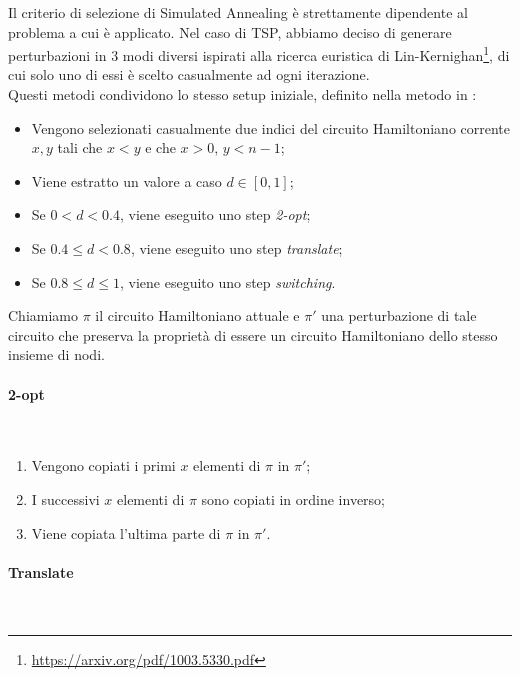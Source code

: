 Il criterio di selezione di Simulated Annealing è strettamente dipendente al problema a cui è applicato. Nel caso di TSP, abbiamo deciso di generare perturbazioni in 3 modi diversi ispirati alla ricerca euristica di Lin-Kernighan\footnote{\url{https://arxiv.org/pdf/1003.5330.pdf}}, di cui solo uno di essi è scelto casualmente ad ogni iterazione. \\

\noindent Questi metodi condividono lo stesso setup iniziale, definito nella metodo  in :

\begin{itemize}
    \item Vengono selezionati casualmente due indici del circuito Hamiltoniano corrente $x, y$ tali che $x < y$ e che $x > 0$, $y < n - 1$;
    \item Viene estratto un valore a caso $d \in [0, 1]$;
    \item Se $0 < d < 0.4$, viene eseguito uno step \textit{2-opt};
    \item Se $0.4 \leq d < 0.8$, viene eseguito uno step \textit{translate};
    \item Se $0.8 \leq d \leq 1$, viene eseguito uno step \textit{switching}.
\end{itemize}

\noindent Chiamiamo $\pi$ il circuito Hamiltoniano attuale e $\pi'$ una perturbazione di tale circuito che preserva la proprietà di essere un circuito Hamiltoniano dello stesso insieme di nodi.

\paragraph{2-opt}\mbox{}\\

\begin{enumerate}
    \item Vengono copiati i primi $x$ elementi di $\pi$ in $\pi'$;
    \item I successivi $x$ elementi di $\pi$ sono copiati in ordine inverso;
    \item Viene copiata l'ultima parte di $\pi$ in $\pi'$.
\end{enumerate}

\paragraph{Translate}\mbox{}\\

